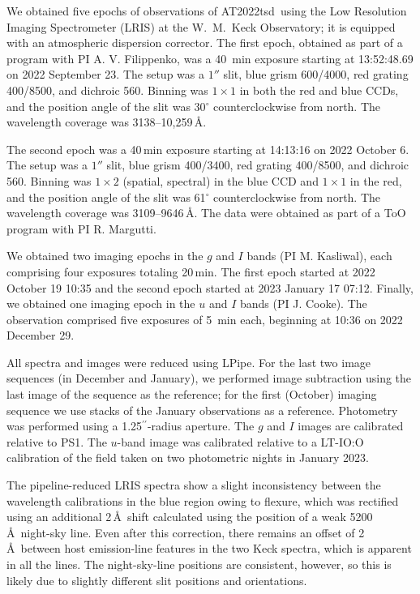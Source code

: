 \documentclass{nature_plusfigure}
\newcommand{\at}{AT2022tsd}
\newcommand{\arcsec}{$^{\prime\prime}$}
\begin{document}
\begin{methods}
We obtained five epochs of observations of \at\ using the Low Resolution Imaging Spectrometer (LRIS\cite{Oke1995}) at the W.~M.~Keck Observatory; it is equipped with an atmospheric dispersion corrector. The first epoch, obtained as part of a program with PI A. V. Filippenko, was a 40~min exposure starting at 13:52:48.69 on 2022 September 23. The setup was a $1''$ slit, blue grism 600/4000, red grating 400/8500, and dichroic 560. Binning was $1 \times 1$ in both the red and blue CCDs, and the position angle of the slit was 30$^\circ$ counterclockwise from north. The wavelength coverage was 3138--10,259\,\AA. 

The second epoch was a 40\,min exposure starting at 14:13:16 on 2022 October 6. The setup was a $1''$ slit, blue grism 400/3400, red grating 400/8500, and dichroic 560. Binning was $1 \times 2$ (spatial, spectral) in the blue CCD and $1\times1$ in the red, and the position angle of the slit was 61$^\circ$ counterclockwise from north. The wavelength coverage was 3109--9646\,\AA. The data were obtained as part of a ToO program with PI R. Margutti. 

We obtained two imaging epochs in the $g$ and $I$ bands (PI M. Kasliwal), each comprising four exposures totaling 20\,min. The first epoch started at 2022 October 19 10:35 and the second epoch started at 2023 January 17 07:12. 
Finally, we obtained one imaging epoch in the $u$ and $I$ bands (PI J. Cooke). The observation comprised five exposures of 5~min each, beginning at 10:36 on 2022 December 29.

All spectra and images were reduced using LPipe\cite{PerleyLPipe}.
For the last two image sequences (in December and January), we performed image subtraction using the last image of the sequence as the reference; for the first (October) imaging sequence we use stacks of the January observations as a reference.  Photometry was performed using a 1.25\arcsec-radius aperture.  The $g$ and $I$ images are calibrated relative to PS1.  The $u$-band image was calibrated relative to a LT-IO:O calibration of the field taken on two photometric nights in January 2023.

The pipeline-reduced LRIS spectra show a slight inconsistency between the wavelength calibrations in the blue region owing to flexure, which was rectified using an additional 2\,\AA\ shift calculated using the position of a weak 5200\,\AA\ night-sky line.
Even after this correction, there remains an offset of 2\,\AA\ between host emission-line features in the two Keck spectra, which is apparent in all the lines. The night-sky-line positions are consistent, however, so this is likely due to slightly different slit positions and orientations. 


\end{methods}
\end{document}
